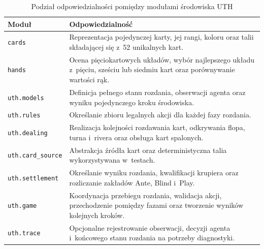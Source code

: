 \begin{table}[htbp]
    \centering
    \caption{Podział odpowiedzialności pomiędzy modułami środowiska UTH}
    \label{tab:moduly-srodowiska}
    \begin{tabular}{|p{}|p{}|}
        \hline
        \textbf{Moduł} & \textbf{Odpowiedzialność} \\
        \hline
        \texttt{cards}
        &
        Reprezentacja pojedynczej karty, jej rangi, koloru oraz talii składającej się z~52 unikalnych kart.
        \\
        \hline

        \texttt{hands}
        &
        Ocena pięciokartowych układów, wybór najlepszego układu z~pięciu,
        sześciu lub siedmiu kart oraz porównywanie wartości rąk.
        \\
        \hline

        \texttt{uth.models}
        &
        Definicja pełnego stanu rozdania, obserwacji agenta oraz wyniku
        pojedynczego kroku środowiska.
        \\
        \hline

        \texttt{uth.rules}
        &
        Określanie zbioru legalnych akcji dla każdej fazy rozdania.
        \\
        \hline

        \texttt{uth.dealing}
        &
        Realizacja kolejności rozdawania kart, odkrywania flopa, turna
        i~rivera oraz obsługa kart spalonych.
        \\
        \hline

        \texttt{uth.card\_source}
        &
        Abstrakcja źródła kart oraz deterministyczna talia wykorzystywana
        w~testach.
        \\
        \hline

        \texttt{uth.settlement}
        &
        Określanie wyniku rozdania, kwalifikacji krupiera oraz rozliczanie
        zakładów Ante, Blind i~Play.
        \\
        \hline

        \texttt{uth.game}
        &
        Koordynacja przebiegu rozdania, walidacja akcji, przechodzenie
        pomiędzy fazami oraz tworzenie wyników kolejnych kroków.
        \\
        \hline

        \texttt{uth.trace}
        &
        Opcjonalne rejestrowanie obserwacji, decyzji agenta i~końcowego
        stanu rozdania na potrzeby diagnostyki.
        \\
        \hline
    \end{tabular}
\end{table}

